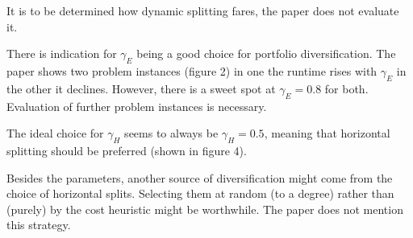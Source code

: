 \documentclass{scrartcl}
\begin{document}
It is to be determined how dynamic splitting fares,
the paper does not evaluate it.

There is indication for \(\gamma_E\) being a good choice for portfolio diversification.
The paper shows two problem instances (figure 2) in one the runtime rises with  \(\gamma_E\)
in the other it declines.
However, there is a sweet spot at \(\gamma_E = 0.8\) for both.
Evaluation of further problem instances is necessary.

The ideal choice for \(\gamma_H\) seems to always be \(\gamma_H = 0.5\),
meaning that horizontal splitting should be preferred (shown in figure 4).

Besides the parameters, another source of diversification might come from the choice of
horizontal splits.
Selecting them at random (to a degree) rather than (purely) by the cost heuristic might
be worthwhile.
The paper does not mention this strategy.
\end{document}
